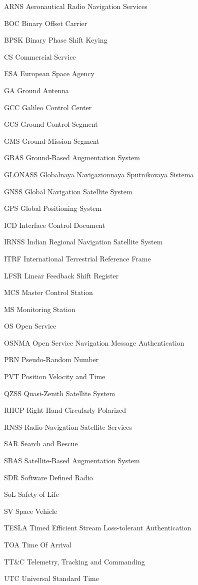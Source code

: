 \begin{abbreviations}

\item[ARNS] Aeronautical Radio Navigation Services
\item[BOC] Binary Offset Carrier
\item[BPSK] Binary Phase Shift Keying
\item[CS] Commercial Service
\item[ESA] European Space Agency
\item[GA] Ground Antenna
\item[GCC] Galileo Control Center
\item[GCS] Ground Control Segment
\item[GMS] Ground Mission Segment 
\item[GBAS] Ground-Based Augmentation System
\item[GLONASS] Globalnaya Navigazionnaya Sputnikovaya Sistema
\item[GNSS] Global Navigation Satellite System
\item[GPS] Global Positioning System
\item[ICD] Interface Control Document
\item[IRNSS] Indian Regional Navigation Satellite System
\item[ITRF] International Terrestrial Reference Frame
\item[LFSR] Linear Feedback Shift Register
\item[MCS] Master Control Station
\item[MS] Monitoring Station
\item[OS] Open Service
\item[OSNMA] Open Service Navigation Message Authentication
\item[PRN] Pseudo-Random Number
\item[PVT] Position Velocity and Time
\item[QZSS] Quasi-Zenith Satellite System
\item[RHCP] Right Hand Circularly Polarized
\item[RNSS] Radio Navigation Satellite Services
\item[SAR] Search and Rescue
\item[SBAS] Satellite-Based Augmentation System
\item[SDR] Software Defined Radio
\item[SoL] Safety of Life
\item[SV] Space Vehicle
\item[TESLA] Timed Efficient Stream Loss-tolerant Authentication
\item[TOA] Time Of Arrival
\item[TT&C] Telemetry, Tracking and Commanding
\item[UTC] Universal Standard Time

\end{abbreviations}
